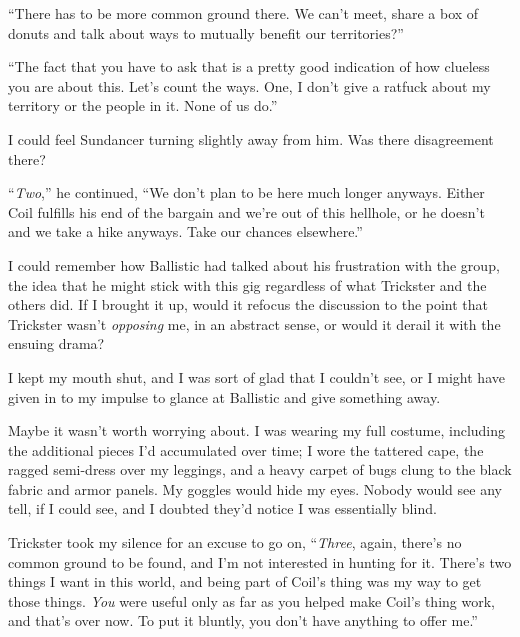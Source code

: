 ``There has to be more common ground there.  We can't meet, share a box of donuts and talk about ways to mutually benefit our territories?''



``The fact that you have to ask that is a pretty good indication of how clueless you are about this. Let's count the ways.  One, I don't give a ratfuck about my territory or the people in it.  None of us do.''



I could feel Sundancer turning slightly away from him.  Was there disagreement there?



``\emph{Two},'' he continued, ``We don't plan to be here much longer anyways.  Either Coil fulfills his end of the bargain and we're out of this hellhole, or he doesn't and we take a hike anyways.  Take our chances elsewhere.''



I could remember how Ballistic had talked about his frustration with the group, the idea that he might stick with this gig regardless of what Trickster and the others did.  If I brought it up, would it refocus the discussion to the point that Trickster wasn't \emph{opposing }me, in an abstract sense, or would it derail it with the ensuing drama?



I kept my mouth shut, and I was sort of glad that I couldn't see, or I might have given in to my impulse to glance at Ballistic and give something away.



Maybe it wasn't worth worrying about.  I was wearing my full costume, including the additional pieces I'd accumulated over time; I wore the tattered cape, the ragged semi-dress over my leggings, and a heavy carpet of bugs clung to the black fabric and armor panels.  My goggles would hide my eyes.  Nobody would see any tell, if I could see, and I doubted they'd notice I was essentially blind.



Trickster took my silence for an excuse to go on, ``\emph{Three}, again, there's no common ground to be found, and I'm not interested in hunting for it.  There's two things I want in this world, and being part of Coil's thing was my way to get those things.  \emph{You} were useful only as far as you helped make Coil's thing work, and that's over now.  To put it bluntly, you don't have anything to offer me.''



